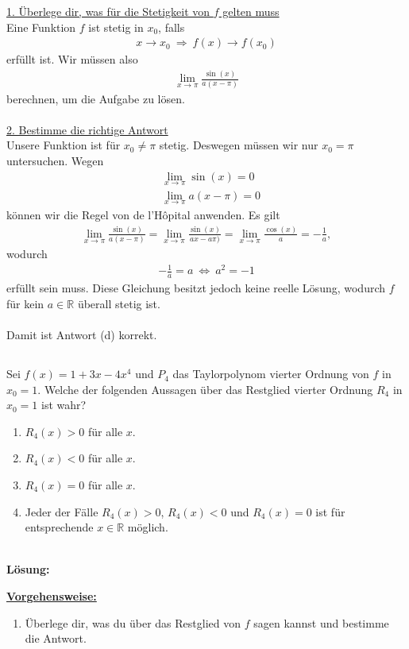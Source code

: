\underline{1. Überlege dir, was für die Stetigkeit von $ f $ gelten muss}\\
Eine Funktion $ f $ ist stetig in $ x_0 $, falls
\begin{align*}
x \to x_0 \ 
\Rightarrow 
\ 
f(x) \to f(x_0)
\end{align*}
erfüllt ist. Wir müssen also
\begin{align*}
\lim \limits_{x \to \pi } \frac{\sin(x)}{a (x- \pi)}
\end{align*}
berechnen, um die Aufgabe zu lösen. 
\\
\\
\underline{2. Bestimme die richtige Antwort}\\
Unsere Funktion ist für $ x_0 \neq \pi  $ stetig.
Deswegen müssen wir nur $ x_0 = \pi $ untersuchen.
Wegen 
\begin{align*}
&\lim \limits_{x \to \pi} \sin(x) = 0\\
&\lim \limits_{x \to \pi} a(x - \pi) =0
\end{align*}
können wir die Regel von de l'H\^{o}pital anwenden. Es gilt
\begin{align*}
\lim \limits_{x \to \pi } \frac{\sin(x)}{a (x- \pi)}
=
\lim \limits_{x \to \pi } \frac{\sin(x)}{a x- a\pi)}
=
\lim \limits_{x \to \pi } \frac{\cos(x)}{a }
=
-\frac{1}{a},
\end{align*}
wodurch
\begin{align*}
- \frac{1}{a} = a
\
\Leftrightarrow
\
a^2 = -1
\end{align*}
erfüllt sein muss. Diese Gleichung besitzt jedoch keine reelle Lösung, wodurch $ f $ für kein $ a \in \mathbb{R} $ überall stetig ist.\\
\\
Damit ist Antwort (d) korrekt.
\newpage
\subsection*{\frage{7}{3}}
Sei $ f(x) = 1 + 3  x- 4  x^4 $ und $ P_4 $ das Taylorpolynom vierter Ordnung von $ f  $ in $ x_0 = 1 $.
Welche der folgenden Aussagen über das Restglied vierter Ordnung $ R_4 $ in $ x_0 = 1 $ ist wahr?
\renewcommand{\labelenumi}{(\alph{enumi})}
\begin{enumerate}
	\item 
	$ R_4(x) > 0  $ für alle $ x $.
	\item
	$ R_4(x) <0  $ für alle $ x $.
	\item
	$ R_4(x) =0  $ für alle $ x $.
	\item
	Jeder der Fälle $ R_4(x ) > 0 $, $ R_4(x) < 0 $ und $ R_4(x) = 0 $ ist für entsprechende $ x \in \mathbb{R} $ möglich.
\end{enumerate}
\ \\
\textbf{Lösung:}
\begin{mdframed}
\underline{\textbf{Vorgehensweise:}}
\renewcommand{\labelenumi}{\theenumi.}
\begin{enumerate}
\item Überlege dir, was du über das Restglied von $ f $ sagen kannst und bestimme die Antwort.
\end{enumerate}
\end{mdframed}

